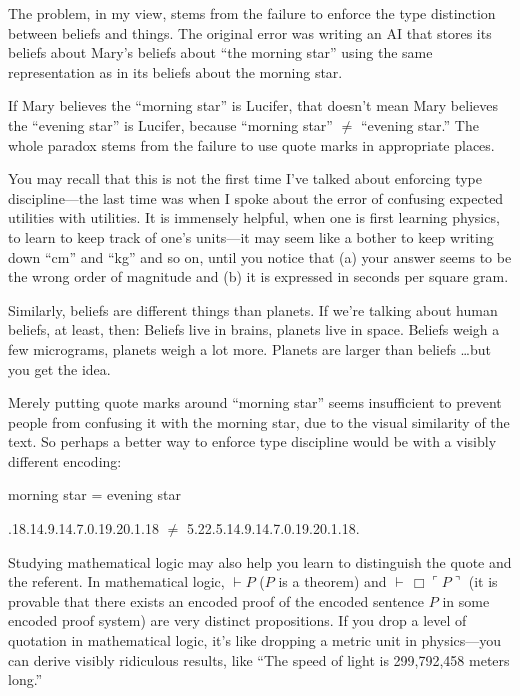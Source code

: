 \bigskip

{
 The problem, in my view, stems from the failure to enforce the
type distinction between beliefs and things. The original error was
writing an AI that stores its beliefs about Mary's
beliefs about ``the morning star''
using the same representation as in its beliefs about the morning
star.}

{
 If Mary believes the ``morning
star'' is Lucifer, that doesn't mean
Mary believes the ``evening star''
is Lucifer, because ``morning star''
${\neq}$ ``evening star.'' The whole
paradox stems from the failure to use quote marks in appropriate
places.}

{
 You may recall that this is not the first time
I've talked about enforcing type discipline---the last
time was when I spoke about the error of confusing expected utilities
with utilities. It is immensely helpful, when one is first learning
physics, to learn to keep track of one's units---it may
seem like a bother to keep writing down
``cm'' and
``kg'' and so on, until you notice
that (a) your answer seems to be the wrong order of magnitude and (b)
it is expressed in seconds per square gram.}

{
 Similarly, beliefs are different things than planets. If
we're talking about human beliefs, at least, then:
Beliefs live in brains, planets live in space. Beliefs weigh a few
micrograms, planets weigh a lot more. Planets are larger than beliefs
\ldots but you get the idea.}

{
 Merely putting quote marks around ``morning
star'' seems insufficient to prevent people from
confusing it with the morning star, due to the visual similarity of the
text. So perhaps a better way to enforce type discipline would be with
a visibly different encoding:}

{\centering
 morning star = evening star
\par}


\bigskip

{.18.14.9.14.7.0.19.20.1.18 ${\neq}$
5.22.5.14.9.14.7.0.19.20.1.18.
\par}


\bigskip

{
 Studying mathematical logic may also help you learn to distinguish
the quote and the referent. In mathematical logic, ${\vdash}P$ ($P$ is a
theorem) and
${\vdash} \, \Box \ulcorner P \urcorner$
(it is provable that there exists an encoded proof of the encoded
sentence $P$ in some encoded proof system) are very distinct
propositions. If you drop a level of quotation in mathematical logic,
it's like dropping a metric unit in physics---you can
derive visibly ridiculous results, like ``The speed of
light is 299,792,458 meters long.''}

